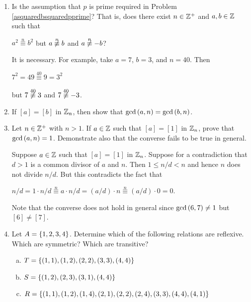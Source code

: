 \documentclass[11pt,fleqn,dvipsnames,usenames]{article}
\newcommand{\p}{\noindent}
\begin{document}
\begin{enumerate}
\item Is the assumption that $p$ is prime required in Problem \ref{asquaredbsquaredpprime}?  That is, does there exist $n\in\mathbb{Z}^{+}$ and $a,b\in\mathbb{Z}$ such that
\begin{center}
$a^2\overset{n}{\equiv}b^2$ but $a\not\overset{n}{\equiv}b$ and $a\not\overset{n}{\equiv}-b$?
\end{center}
\vsmsp

\solution It is necessary.  For example, take $a = 7$, $b=3$, and $n=40$.  Then
\begin{center}
$7^2 = 49 \overset{40}{\equiv}9 = 3^2$
\end{center}
but $7\not\overset{40}{\equiv}3$ and $7\not\overset{40}{\equiv}-3$.

\item If $[a] = [b]$ in $\mathbb{Z}_{n}$, then show that $\text{gcd}\left(a,n\right) = \text{gcd}\left(b,n\right)$.


\item Let $n\in\mathbb{Z}^{+}$ with $n > 1$.  If $a\in \mathbb{Z}$ such that $[a] = [1]$ in $\mathbb{Z}_{n}$, prove that $\text{gcd}\left(a,n\right) = 1$.  Demonstrate also that the converse fails to be true in general.
\vsmsp

\solution Suppose $a\in\mathbb{Z}$ such that $[a] = [1]$ in $\mathbb{Z}_{n}$.  Suppose for a contradiction that $d>1$ is a common divisor of $a$ and $n$.  Then $1 \leq n/d < n$ and hence $n$ does not divide $n/d$.  But this contradicts the fact that
\begin{center}
$n/d = 1\cdot n/d \overset{n}{\equiv} a\cdot n/d = (a/d)\cdot n \overset{n}{\equiv}(a/d)\cdot 0 = 0$.
\end{center}
\vsmsp

\p Note that the converse does not hold in general since $\text{gcd}\left(6,7\right)\neq 1$ but $[6]\neq [7]$.

\item Let $A = \left\{1,2,3,4\right\}$.  Determine which of the following relations are reflexive.  Which are symmetric?  Which are transitive?
\begin{enumerate}[(a)]
\item $T = \left\{(1,1), (1,2), (2,2), (3,3), (4,4)\right\}$
\item $S = \left\{(1,2), (2,3), (3,1), (4,4)\right\}$
\item $R = \left\{(1,1), (1,2), (1,4), (2,1), (2,2), (2,4), (3,3), (4,4), (4,1)\right\}$
\end{enumerate}
\vsmsp


\end{enumerate}
\end{document}
